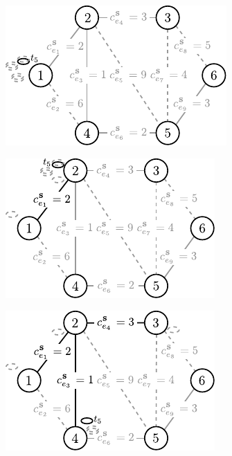 \begin{figure}[!htbp]
	\null\hfill
	\begin{subfigure}[b]{0.254\textwidth}
		\includegraphics[width=\textwidth]{Chapter_III/MST4-example/a}
		\caption{}
		\label{fig:mst4Example:a}
	\end{subfigure}
	\hfill
	\begin{subfigure}[b]{0.242\textwidth}
		\includegraphics[width=\textwidth]{Chapter_III/MST4-example/b}
		\caption{}
		\label{fig:mst4Example:b}
	\end{subfigure}
	\hfill
	\begin{subfigure}[b]{0.242\textwidth}
		\includegraphics[width=\textwidth]{Chapter_III/MST4-example/c}

\end{subfigure}
\end{figure}
